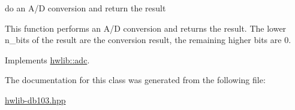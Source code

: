 do an A/D conversion and return the result 

This function performs an A/D conversion and returns the result. The lower n\+\_\+bits of the result are the conversion result, the remaining higher bits are 0. 

Implements \hyperlink{classhwlib_1_1adc_a97c3dee32f72a2e7278e01b1a8e924ec}{hwlib\+::adc}.



The documentation for this class was generated from the following file\+:\begin{DoxyCompactItemize}
\item 
\hyperlink{hwlib-db103_8hpp}{hwlib-\/db103.\+hpp}\end{DoxyCompactItemize}
